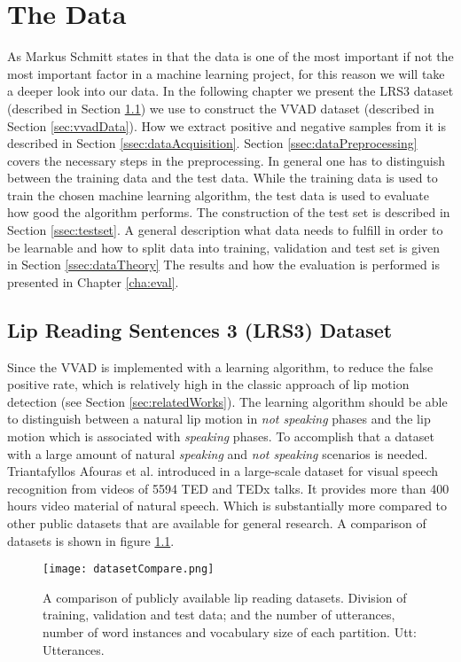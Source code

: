 \chapter{The Data}
\label{cha:data}
As Markus Schmitt states in \cite{Schmitt2018} that the data is one of the most important if not the most important
factor in a machine learning project, for this reason we will take a deeper look into our data.
In the following chapter we present
the LRS3 dataset (described in Section \ref{sec:lrs3}) we use to construct the VVAD dataset (described in Section \ref{sec:vvadData}).
How we extract positive and negative samples from it is described in Section \ref{ssec:dataAcquisition}.
Section \ref{ssec:dataPreprocessing} covers the necessary steps in the preprocessing.
In general one has to distinguish between the training data and the test data. While the training data is
used to train the chosen machine learning algorithm, the test data is used to evaluate how good the algorithm performs.
The construction of the test set is described in Section \ref{ssec:testset}.
A general description what data needs to fulfill in order to be learnable and how to split data into training, validation and test set is given in Section \ref{ssec:dataTheory}
The results and how the evaluation is performed is presented in Chapter \ref{cha:eval}.

\section{Lip Reading Sentences 3 (LRS3) Dataset}\label{sec:lrs3}
Since the VVAD is implemented with a learning algorithm, to reduce the false positive rate, which is relatively high in the classic approach of lip motion detection (see Section \ref{sec:relatedWorks}).
The learning algorithm should be able to distinguish between a natural lip motion in \emph{ not speaking} phases and the lip motion which is associated with \emph{speaking} phases.
To accomplish that a dataset with a large amount of natural \emph{speaking} and \emph{not speaking} scenarios is needed.
Triantafyllos Afouras et al. introduced in \cite{Chung18} a large-scale dataset for visual speech recognition from videos of 5594 TED and TEDx talks.
It provides more than 400 hours video material of natural speech.
Which is substantially more compared to other
public datasets that are available for general research.
A comparison of datasets is shown in figure \ref{fig:datasetCompare}.

\begin{figure}
  \centering
  \texttt{[image: datasetCompare.png]}
  \caption{A comparison of publicly available lip reading datasets. Division of training, validation and test data; and the number of utterances, number
of word instances and vocabulary size of each partition. Utt: Utterances.\cite{Chung18}}
  \label{fig:datasetCompare}
\end{figure}

